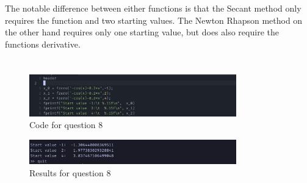 \documentclass{article}
\begin{document}
The notable difference between either functions is that the Secant method only requires the function and two starting values. The Newton Rhapson method on the other hand requires only one starting value, but does also require the functions derivative. 
\newpage
\section{}

\begin{figure}[H]
	\centering
	\includegraphics[width=0.8\textwidth]{imgs/q8_code.png}
	\caption{Code for question 8}
	\label{fig:q8_code}
\end{figure}

\begin{figure}[H]
	\centering
	\includegraphics[width=0.8\textwidth]{imgs/q8_results.png}
	\caption{Results for question 8}
	\label{fig:q8_result}
\end{figure}
\end{document}
